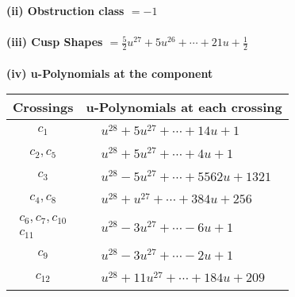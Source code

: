 \documentclass[1p]{elsarticle_modified}
\theoremstyle{definition}
\begin{document}
\flushleft \textbf{(ii) Obstruction class $= -1$}\\~\\
\flushleft \textbf{(iii) Cusp Shapes $= \frac{5}{2} u^{27}+5 u^{26}+\cdots+21 u+\frac{1}{2}$}\\~\\
\newpage\renewcommand{\arraystretch}{1}
\flushleft \textbf{(iv) u-Polynomials at the component}\newline \\
\begin{tabular}{m{50pt}|m{274pt}}
Crossings & \hspace{64pt}u-Polynomials at each crossing \\
\hline $$\begin{aligned}c_{1}\end{aligned}$$&$\begin{aligned}
&u^{28}+5 u^{27}+\cdots+14 u+1
\end{aligned}$\\
\hline $$\begin{aligned}c_{2},c_{5}\end{aligned}$$&$\begin{aligned}
&u^{28}+5 u^{27}+\cdots+4 u+1
\end{aligned}$\\
\hline $$\begin{aligned}c_{3}\end{aligned}$$&$\begin{aligned}
&u^{28}-5 u^{27}+\cdots+5562 u+1321
\end{aligned}$\\
\hline $$\begin{aligned}c_{4},c_{8}\end{aligned}$$&$\begin{aligned}
&u^{28}+u^{27}+\cdots+384 u+256
\end{aligned}$\\
\hline $$\begin{aligned}c_{6},c_{7},c_{10}\\c_{11}\end{aligned}$$&$\begin{aligned}
&u^{28}-3 u^{27}+\cdots-6 u+1
\end{aligned}$\\
\hline $$\begin{aligned}c_{9}\end{aligned}$$&$\begin{aligned}
&u^{28}-3 u^{27}+\cdots-2 u+1
\end{aligned}$\\
\hline $$\begin{aligned}c_{12}\end{aligned}$$&$\begin{aligned}
&u^{28}+11 u^{27}+\cdots+184 u+209
\end{aligned}$\\
\hline
\end{tabular}\\~\\
\end{document}
